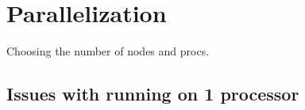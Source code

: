 \chapter{Parallelization}

Choosing the number of nodes and procs.

\section{Issues with running on 1 processor}
